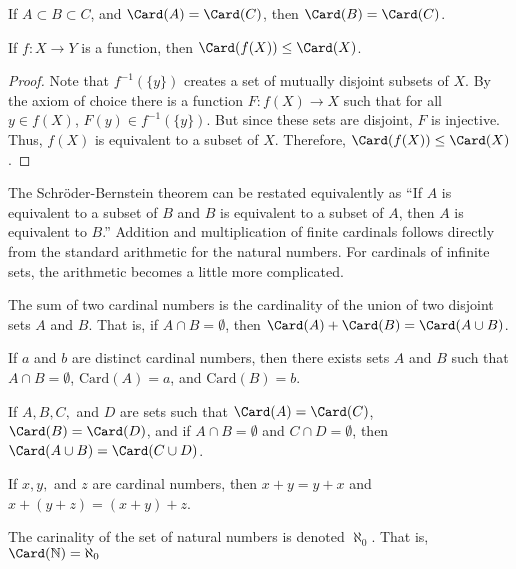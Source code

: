     \begin{theorem}
        If ${A}\subset{B}\subset{C}$, and
        $\Card(A)=\Card(C)$, then $\Card(B)=\Card(C)$.
    \end{theorem}
    \begin{theorem}
        If $f:{X}\rightarrow{Y}$ is a function,
        then $\Card(f(X))\leq\Card(X)$.
    \end{theorem}
    \begin{proof}
        Note that $f^{-1}(\{y\})$ creates a set of mutually disjoint
        subsets of $X$. By the axiom of choice there is a function
        $F:{f(X)}\rightarrow{X}$ such that for all ${y}\in{f(X)}$,
        ${F(y)}\in{f^{-1}(\{y\})}$. But since these sets are disjoint,
        $F$ is injective. Thus, $f(X)$ is equivalent to a subset of $X$.
        Therefore, $\Card(f(X))\leq\Card(X)$.
    \end{proof}
    The Schr\"{o}der-Bernstein theorem can be restated equivalently as
    ``If $A$ is equivalent to a subset of $B$ and $B$ is equivalent to a
    subset of $A$, then $A$ is equivalent to $B$.'' Addition and
    multiplication of finite cardinals follows directly from the standard
    arithmetic for the natural numbers. For cardinals of infinite sets,
    the arithmetic becomes a little more complicated.
    \begin{definition}
        The sum of two cardinal numbers is the cardinality of the union of two
        disjoint sets $A$ and $B$. That is, if ${A}\cap{B}=\emptyset$, then
        $\Card(A)+\Card(B)=\Card({A}\cup{B})$.
    \end{definition}
    \begin{theorem}
        If $a$ and $b$ are distinct cardinal numbers, then there exists sets $A$
        and $B$ such that ${A}\cap{B}=\emptyset$, $\textrm{Card}(A)=a$, and
        $\textrm{Card}(B)=b$.
    \end{theorem}
    \begin{theorem}
        If $A,B,C,$ and $D$ are sets such that $\Card(A)=\Card(C)$,
        $\Card(B)=\Card(D)$, and if ${A}\cap{B}=\emptyset$ and
        ${C}\cap{D}=\emptyset$, then
        $\Card({A}\cup{B})=\Card({C}\cup{D})$.
    \end{theorem}
    \begin{theorem}
        If $x,y,$ and $z$ are cardinal numbers, then
        $x+y=y+x$ and $x+(y+z)=(x+y)+z$.
    \end{theorem}
    The carinality of the set of natural numbers is denoted $\aleph_{0}$.
    That is, $\Card(\mathbb{N})=\aleph_{0}$
